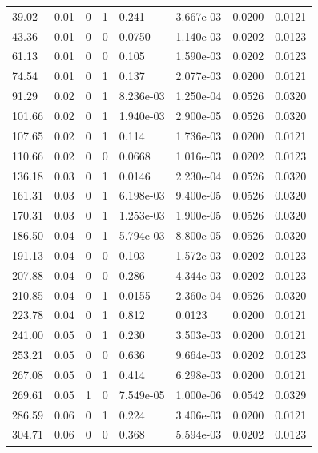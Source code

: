 \documentclass[preview]{standalone}
\begin{document}
{{\begin{tabular}{L{1.2cm}C{1.2cm} C{0.3cm}C{0.5cm} C{1.4cm}C{1.4cm} C{1.4cm}C{1.4cm}}
  39.02  &  0.01  & 0     &  1 &  0.241  & 3.667e-03  & 0.0200 &  0.0121   \\ 
  43.36  &  0.01  & 0     &  0 &  0.0750  & 1.140e-03  & 0.0202 &  0.0123   \\ 
  61.13  &  0.01  & 0     &  0 &  0.105  & 1.590e-03  & 0.0202 &  0.0123   \\ 
  74.54  &  0.01  & 0     &  1 &  0.137  & 2.077e-03  & 0.0200 &  0.0121   \\ 
  91.29  &  0.02  & 0     &  1 &  8.236e-03  & 1.250e-04  & 0.0526 &  0.0320   \\ 
  101.66  &  0.02  & 0     &  1 &  1.940e-03  & 2.900e-05  & 0.0526 &  0.0320   \\ 
  107.65  &  0.02  & 0     &  1 &  0.114  & 1.736e-03  & 0.0200 &  0.0121   \\ 
  110.66  &  0.02  & 0     &  0 &  0.0668  & 1.016e-03  & 0.0202 &  0.0123   \\ 
  136.18  &  0.03  & 0     &  1 &  0.0146  & 2.230e-04  & 0.0526 &  0.0320   \\ 
  161.31  &  0.03  & 0     &  1 &  6.198e-03  & 9.400e-05  & 0.0526 &  0.0320   \\ 
  170.31  &  0.03  & 0     &  1 &  1.253e-03  & 1.900e-05  & 0.0526 &  0.0320   \\ 
  186.50  &  0.04  & 0     &  1 &  5.794e-03  & 8.800e-05  & 0.0526 &  0.0320   \\ 
  191.13  &  0.04  & 0     &  0 &  0.103  & 1.572e-03  & 0.0202 &  0.0123   \\ 
  207.88  &  0.04  & 0     &  0 &  0.286  & 4.344e-03  & 0.0202 &  0.0123   \\ 
  210.85  &  0.04  & 0     &  1 &  0.0155  & 2.360e-04  & 0.0526 &  0.0320   \\ 
  223.78  &  0.04  & 0     &  1 &  0.812  & 0.0123  & 0.0200 &  0.0121   \\ 
  241.00  &  0.05  & 0     &  1 &  0.230  & 3.503e-03  & 0.0200 &  0.0121   \\ 
  253.21  &  0.05  & 0     &  0 &  0.636  & 9.664e-03  & 0.0202 &  0.0123   \\ 
  267.08  &  0.05  & 0     &  1 &  0.414  & 6.298e-03  & 0.0200 &  0.0121   \\ 
  269.61  &  0.05  & 1     &  0 &  7.549e-05  & 1.000e-06  & 0.0542 &  0.0329   \\ 
  286.59  &  0.06  & 0     &  1 &  0.224  & 3.406e-03  & 0.0200 &  0.0121   \\ 
  304.71  &  0.06  & 0     &  0 &  0.368  & 5.594e-03  & 0.0202 &  0.0123   \\ 

\end{tabular}}}
\end{document}
